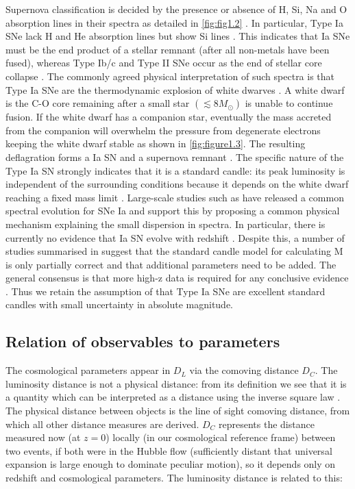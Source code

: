 Supernova classification is decided by the presence or absence of H, Si, Na and O absorption lines in their spectra as detailed in \cref{fig:fig1.2} \cite{Leibundgut2008}. In particular, Type Ia SNe lack H and He absorption lines but show Si lines \cite{Lidman2010b}. This indicates that Ia SNe must be the end product of a stellar remnant (after all non-metals have been fused), whereas Type Ib/c and Type II SNe occur as the end of stellar core collapse \cite{Leibundgut2008}. The commonly agreed physical interpretation of such spectra is that Type Ia SNe are the thermodynamic explosion of white dwarves \cite{Lidman2010b,Leibundgut2008,Mazzali2007}. A white dwarf is the C-O core remaining after a small star $\left( \lesssim 8 M_{\odot} \right)$ is unable to continue fusion. If the white dwarf has a companion star, eventually the mass accreted from the companion will overwhelm the pressure from degenerate electrons keeping the white dwarf stable as shown in \cref{fig:figure1.3}. The resulting deflagration forms a Ia SN and a supernova remnant \cite{Lidman2010b}. The specific nature of the Type Ia SN strongly indicates that it is a standard candle: its peak luminosity is independent of the surrounding conditions because it depends on the white dwarf reaching a fixed mass limit \cite{Mazzali2007}. Large-scale studies such as \cite{Guy2007} have released a common spectral evolution for SNe Ia and \cite{Mazzali2007} support this by proposing a common physical mechanism explaining the small dispersion in spectra. In particular, there is currently no evidence that Ia SN evolve with redshift \cite{Linder1988b}. Despite this, a number of studies summarised in \cite{Lidman2010b} suggest that the standard candle model for calculating M is only partially correct and that additional parameters need to be added. The general consensus is that more high-z data is required for any conclusive evidence \cite{Lidman2010b,Linder2009,Mazzali2007}. Thus we retain the assumption of \cite{Hicken2009} that Type Ia SNe are excellent standard candles with small uncertainty in absolute magnitude.

\subsection{Relation of observables to parameters}
\label{subsec:observables-to-parameters}

The cosmological parameters appear in $D_L$ via the comoving distance $D_C$. The luminosity distance is not a physical distance: from its definition we see that it is a quantity which can be interpreted as a distance using the inverse square law \cite{Hogg2000}. The physical distance between objects is the line of sight comoving distance, from which all other distance measures are derived\cite{Hogg2000}. $D_C$ represents the distance measured now (at $z = 0$) locally (in our cosmological reference frame) between two events, if both were in the Hubble flow (sufficiently distant that universal expansion is large enough to dominate peculiar motion), so it depends only on redshift and cosmological parameters\cite{Hogg2000}. The luminosity distance is related to this:

